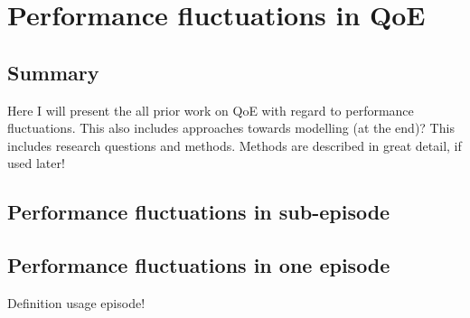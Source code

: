 \chapter{Performance fluctuations in QoE}


\section*{Summary}
Here I will present the all prior work on QoE with regard to performance fluctuations.
This also includes approaches towards modelling (at the end)?
This includes research questions and methods.
Methods are described in great detail, if used later!

\section{Performance fluctuations in sub-episode}

\section{Performance fluctuations in one episode}

Definition usage episode!